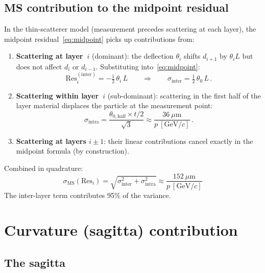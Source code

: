 \documentclass[11pt,a4paper]{article}
\begin{document}
\subsection{MS contribution to the midpoint residual}

In the thin-scatterer model (measurement precedes scattering at each
layer), the midpoint residual~\eqref{eq:midpoint} picks up
contributions from:
\begin{enumerate}
\item \textbf{Scattering at layer~$i$} (dominant): the deflection
      $\theta_i$ shifts $d_{i+1}$ by $\theta_i L$ but does not affect
      $d_i$ or $d_{i-1}$.  Substituting into~\eqref{eq:midpoint}:
\begin{equation}
\mathrm{Res}_i^{(\mathrm{inter})} = -\tfrac{1}{2}\,\theta_i\,L
\qquad\Longrightarrow\qquad
\sigma_{\mathrm{inter}} = \tfrac{1}{2}\,\theta_0\,L\,.
\end{equation}

\item \textbf{Scattering within layer~$i$} (sub-dominant):
      scattering in the first half of the layer material
      displaces the particle at the measurement point:
\begin{equation}
\sigma_{\mathrm{intra}} =
\frac{\theta_{0,\mathrm{half}}\times t/2}{\sqrt{3}}
\approx \frac{36~\mu\mathrm{m}}{p~[\mathrm{GeV}/c]}\,.
\end{equation}

\item \textbf{Scattering at layers $i{\pm}1$}: their linear
      contributions cancel exactly in the midpoint formula (by
      construction).
\end{enumerate}

\noindent
Combined in quadrature:
\begin{equation}
\boxed{
\sigma_{\mathrm{MS}}(\mathrm{Res}_i)
= \sqrt{\sigma_{\mathrm{inter}}^2 + \sigma_{\mathrm{intra}}^2}
\approx \frac{152~\mu\mathrm{m}}{p~[\mathrm{GeV}/c]}
}
\end{equation}
The inter-layer term contributes 95\% of the variance.

\section{Curvature (sagitta) contribution}

\subsection{The sagitta}
\end{document}
